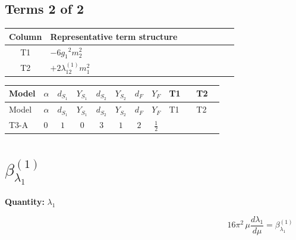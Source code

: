\documentclass[8pt]{article}
\begin{document}
\begin{landscape}
\subsection*{Terms 2 of 2}
\begin{center}
\begin{tabular}{@{}c >{\raggedright\arraybackslash}p{0.82\linewidth}@{}}
\toprule
Column & Representative term structure \\
\midrule
T1 & \(\displaystyle -6 {g_1}^2 {m_2^2}\) \\
\midrule
T2 & \(\displaystyle +2 {\lambda_{12}^{(1)}} {m_1^2}\) \\
\midrule
\bottomrule
\end{tabular}
\end{center}
\smallskip
\tiny
\begin{longtable}{@{}llcccccc >{\raggedright\arraybackslash}p{0.21\linewidth} >{\raggedright\arraybackslash}p{0.21\linewidth}@{}}
\toprule
Model & $\alpha$ & $d_{S_1}$ & $Y_{S_1}$ & $d_{S_2}$ & $Y_{S_2}$ & $d_F$ & $Y_F$ & T1 & T2 \\
\midrule
\endfirsthead
\toprule
Model & $\alpha$ & $d_{S_1}$ & $Y_{S_1}$ & $d_{S_2}$ & $Y_{S_2}$ & $d_F$ & $Y_F$ & T1 & T2 \\
\midrule
\endhead
T3-A & $0$ & $1$ & $0$ & $3$ & $1$ & $2$ & $\frac{1}{2}$ & \scriptsize\adjustbox{max width=\linewidth}{$\begin{gathered} -6 {g_1}^2 {m_2^2}\end{gathered}$} & \scriptsize\adjustbox{max width=\linewidth}{$\begin{gathered} +2 {\lambda_{12}^{(1)}} {m_1^2}\end{gathered}$} \\
\midrule
\bottomrule
\end{longtable}
\clearpage
\section*{$\beta_{\lambda_1}^{(1)}$}
\noindent\textbf{Quantity: }$\lambda_1$\par\smallskip
\[16\pi^2\,\mu\frac{d \lambda_1}{d\mu}=\beta_{\lambda_1}^{(1)}\]

\end{landscape}
\end{document}
